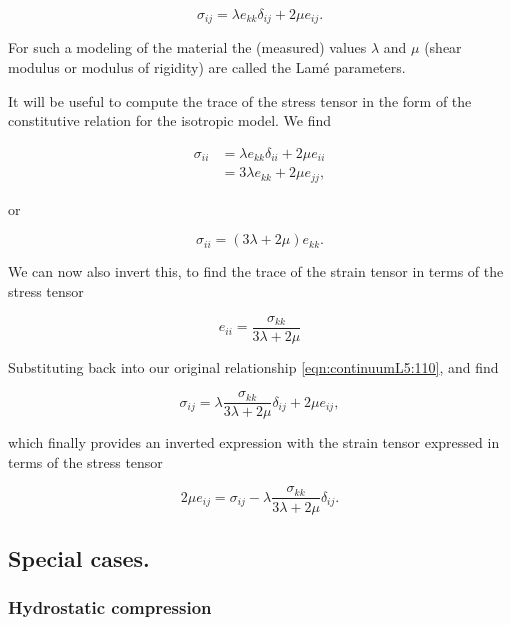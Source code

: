 \begin{equation}\label{eqn:continuumL5:110}
\boxed{
\sigma_{ij} = \lambda e_{kk} \delta_{ij} + 2 \mu e_{ij}.
}
\end{equation}

For such a modeling of the material the (measured) values $\lambda$ and $\mu$ (shear modulus or modulus of rigidity) are called the Lam\'e parameters.

It will be useful to compute the trace of the stress tensor in the form of the constitutive relation for the isotropic model.  We find

\begin{align*}
\sigma_{ii}
&= \lambda e_{kk} \delta_{ii} + 2 \mu e_{ii} \\
&= 3 \lambda e_{kk} + 2 \mu e_{jj},
\end{align*}

or

\begin{equation}\label{eqn:continuumL5:150}
\sigma_{ii} = (3 \lambda + 2 \mu) e_{kk}.
\end{equation}

We can now also invert this, to find the trace of the strain tensor in terms of the stress tensor

\begin{equation}\label{eqn:continuumL5:130}
e_{ii} = \frac{\sigma_{kk}}{3 \lambda + 2 \mu}
\end{equation}

Substituting back into our original relationship \ref{eqn:continuumL5:110}, and find

\begin{equation}\label{eqn:continuumL5:110b}
\sigma_{ij} = \lambda \frac{\sigma_{kk}}{3 \lambda + 2 \mu} \delta_{ij} + 2 \mu e_{ij},
\end{equation}

which finally provides an inverted expression with the strain tensor expressed in terms of the stress tensor

\begin{equation}\label{eqn:continuumL5:110c}
\boxed{
2 \mu e_{ij} =
\sigma_{ij} - \lambda \frac{\sigma_{kk}}{3 \lambda + 2 \mu} \delta_{ij}.
}
\end{equation}

\subsection{Special cases.}
\subsubsection{Hydrostatic compression}

